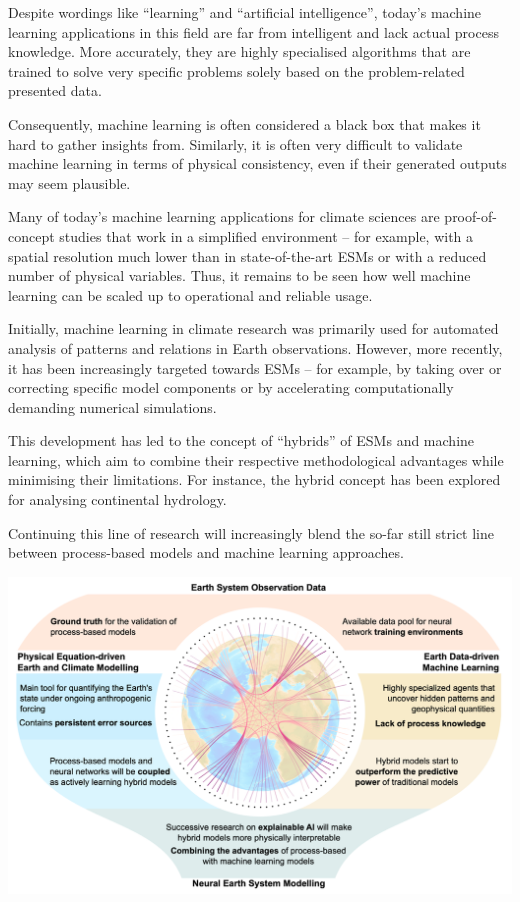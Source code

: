 \documentclass[
]{book}
\begin{document}
Despite wordings like ``learning'' and ``artificial intelligence'', today's machine learning applications in this field are far from intelligent and lack actual process knowledge. More accurately, they are highly specialised algorithms that are trained to solve very specific problems solely based on the problem-related presented data.

Consequently, machine learning is often considered a black box that makes it hard to gather insights from. Similarly, it is often very difficult to validate machine learning in terms of physical consistency, even if their generated outputs may seem plausible.

Many of today's machine learning applications for climate sciences are proof-of-concept studies that work in a simplified environment -- for example, with a spatial resolution much lower than in state-of-the-art ESMs or with a reduced number of physical variables. Thus, it remains to be seen how well machine learning can be scaled up to operational and reliable usage.

Initially, machine learning in climate research was primarily used for automated analysis of patterns and relations in Earth observations. However, more recently, it has been increasingly targeted towards ESMs -- for example, by taking over or correcting specific model components or by accelerating computationally demanding numerical simulations.

This development has led to the concept of ``hybrids'' of ESMs and machine learning, which aim to combine their respective methodological advantages while minimising their limitations. For instance, the hybrid concept has been explored for analysing continental hydrology.

Continuing this line of research will increasingly blend the so-far still strict line between process-based models and machine learning approaches.

\includegraphics{fig/Neural_ESM.png}
\end{document}
